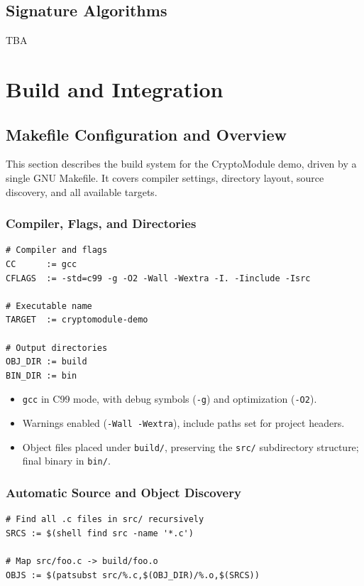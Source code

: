 \documentclass[11pt,a4paper]{report}
\theoremstyle{definitionstyle}
\begin{document}
\section{Signature Algorithms}
TBA

\chapter{Build and Integration}

\section{Makefile Configuration and Overview}
This section describes the build system for the CryptoModule demo, driven by a single GNU Makefile. It covers compiler settings, directory layout, source discovery, and all available targets.

\subsection{Compiler, Flags, and Directories}
\begin{lstlisting}[numbers=none]
# Compiler and flags
CC      := gcc
CFLAGS  := -std=c99 -g -O2 -Wall -Wextra -I. -Iinclude -Isrc

# Executable name
TARGET  := cryptomodule-demo

# Output directories
OBJ_DIR := build
BIN_DIR := bin
\end{lstlisting}
\begin{itemize}
	\item \texttt{gcc} in C99 mode, with debug symbols (\texttt{-g}) and optimization (\texttt{-O2}).
	\item Warnings enabled (\texttt{-Wall -Wextra}), include paths set for project headers.
	\item Object files placed under \texttt{build/}, preserving the \texttt{src/} subdirectory structure; final binary in \texttt{bin/}.
\end{itemize}

\subsection{Automatic Source and Object Discovery}
\begin{lstlisting}[numbers=none]
# Find all .c files in src/ recursively
SRCS := $(shell find src -name '*.c')

# Map src/foo.c -> build/foo.o
OBJS := $(patsubst src/%.c,$(OBJ_DIR)/%.o,$(SRCS))
\end{lstlisting}
\end{document}
